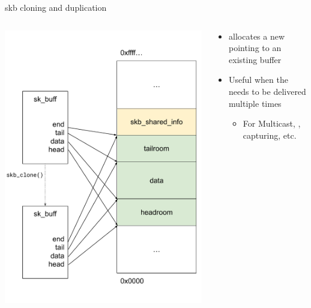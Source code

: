 \begin{frame}{skb cloning and duplication}
	\begin{columns}
		\begin{column}{0.3\textwidth}
			\includegraphics[width=\textwidth]{slides/networking-skb/skb_clone.pdf}
		\end{column}
		\begin{column}{0.7\textwidth}
			\begin{itemize}
				\item {} allocates a new  pointing to an existing buffer
				\item Useful when the  needs to be delivered multiple times
					\begin{itemize}
						\item For Multicast, , capturing, etc.
					\end{itemize}

\end{itemize}
\end{column}
\end{columns}
\end{frame}
